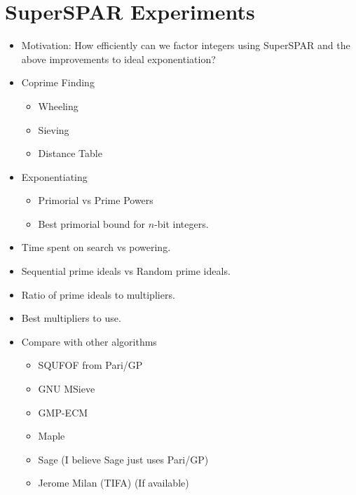 \documentclass[11pt, letterpaper]{article}
\theoremstyle{definition}
\begin{document}
\bigbreak
\section{SuperSPAR Experiments}
\begin{itemize}
\item Motivation: How efficiently can we factor integers using SuperSPAR and the above improvements to ideal exponentiation?


\item Coprime Finding
	\begin{itemize}
	\item Wheeling
	\item Sieving
	\item Distance Table
	\end{itemize}

	\item Exponentiating 
	\begin{itemize}
	\item Primorial vs Prime Powers
	\item Best primorial bound for $n$-bit integers.
	\end{itemize}
	
\item Time spent on search vs powering.
\item Sequential prime ideals vs Random prime ideals.
\item Ratio of prime ideals to multipliers.
\item Best multipliers to use.

\item Compare with other algorithms
	\begin{itemize}
	\item SQUFOF from Pari/GP
	\item GNU MSieve
	\item GMP-ECM
	\item Maple
	\item Sage (I believe Sage just uses Pari/GP)
	\item Jerome Milan (TIFA) (If available)
	\end{itemize}

\end{itemize}




\bigbreak
\end{document}
